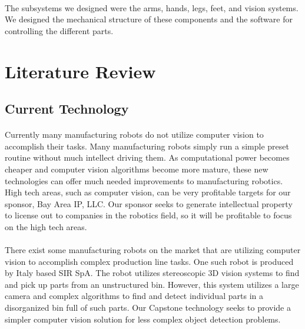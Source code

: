 \documentclass[letterpaper]{article}
\begin{document}
\paragraph{}The subsystems we designed were the arms, hands, legs, feet, and
vision systems.  We designed the mechanical structure of these components and
the software for controlling the different parts. 

\section{Literature Review}
\subsection{Current Technology}
\paragraph{}Currently many manufacturing robots do not utilize computer vision to
accomplish their tasks. Many manufacturing robots simply run a simple preset
routine without much intellect driving them. As computational power becomes
cheaper and computer vision algorithms become more mature, these new
technologies can offer much needed improvements to manufacturing robotics. High
tech areas, such as computer vision, can be very profitable targets for our
sponsor, Bay Area IP, LLC. Our sponsor seeks to generate intellectual property
to license out to companies in the robotics field, so it will be profitable to
focus on the high tech areas. 

\paragraph{} There exist some manufacturing robots on the market that are
utilizing computer vision to accomplish complex production line tasks. One such
robot is produced by Italy based SIR SpA. The robot utilizes stereoscopic 3D
vision systems to find and pick up parts from an unstructured bin. However,
this system utilizes a large camera and complex algorithms to find and detect
individual parts in a disorganized bin full of such parts\cite{SIRfuture}. Our
Capstone technology seeks to provide a simpler computer vision solution for
less complex object detection problems.
\end{document}
